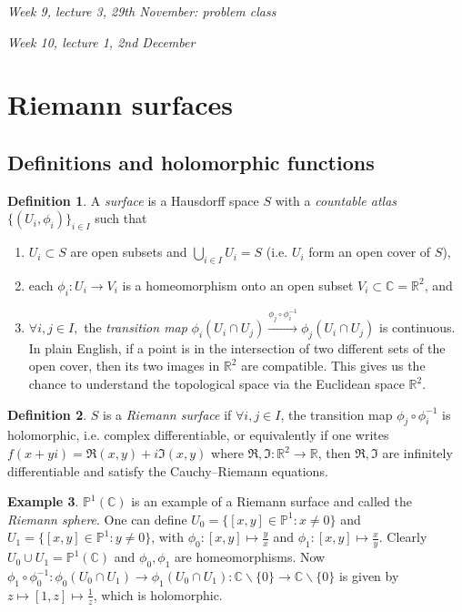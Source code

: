 \documentclass{article}
\newcommand{\R}{\mathbb{R}}
\newcommand{\C}{\mathbb{C}}
\newcommand{\p}{\mathbb{P}}
\theoremstyle{definition}
\newtheorem{defn}{Definition}[subsection]
\newtheorem{example}[defn]{Example}
\begin{document}
\begin{flushright}
\textit{Week 9, lecture 3, 29th November: problem class}
\end{flushright}

\begin{flushright}
\textit{Week 10, lecture 1, 2nd December}
\end{flushright}

\section{Riemann surfaces}
\subsection{Definitions and holomorphic functions}
\begin{defn}
A \textit{surface} is a Hausdorff space $S$ with a \textit{countable atlas} $\{(U_i,\phi_i)\}_{i\in I}$ such that
\begin{enumerate}
\item $U_i\subset S$ are open subsets and $\bigcup_{i\in I}U_i=S$ (i.e. $U_i$ form an open cover of $S$),
\item each $\phi_i:U_i\rightarrow V_i$ is a homeomorphism onto an open subset $V_i\subset\C=\R^2$, and
\item $\forall i,j\in I,$ the \textit{transition map} $\phi_i(U_i\cap U_j)\xrightarrow{\phi_j\circ\phi_i^{-1}} \phi_j(U_i\cap U_j)$ is continuous. In plain English, if a point is in the intersection of two different sets of the open cover, then its two images in $\R^2$ are compatible. This gives us the chance to understand the topological space via the Euclidean space $\R^2$.
\end{enumerate}
\end{defn}

\begin{defn}
$S$ is a \textit{Riemann surface} if $\forall i,j\in I$, the transition map $\phi_j\circ\phi_i^{-1}$ is holomorphic, i.e. complex differentiable, or equivalently if one writes $f(x+yi)=\Re(x,y)+i\Im(x,y)$ where $\Re,\Im:\R^2\rightarrow \R$, then $\Re,\Im$ are infinitely differentiable and satisfy the Cauchy--Riemann equations.
\end{defn}

\begin{example}
\label{example:P1CasRiemannsurf}
$\p^1(\C)$ is an example of a Riemann surface and called the \textit{Riemann sphere}. One can define $U_0=\{[x,y]\in\p^1:x\neq 0\}$ and $U_1=\{[x,y]\in\p^1:y\neq 0\}$, with $\phi_0:[x,y]\mapsto\frac{y}{x}$ and $\phi_1:[x,y]\mapsto\frac{x}{y}$. Clearly $U_0\cup U_1=\p^1(\C)$ and $\phi_0,\phi_1$ are homeomorphisms. Now $\phi_1\circ\phi_0^{-1}:\phi_0(U_0\cap U_1)\rightarrow\phi_1(U_0\cap U_1):\C\backslash\{0\}\rightarrow\C\backslash\{0\}$ is given by $z\mapsto[1,z]\mapsto\frac{1}{z}$, which is holomorphic.
\end{example}
\end{document}

